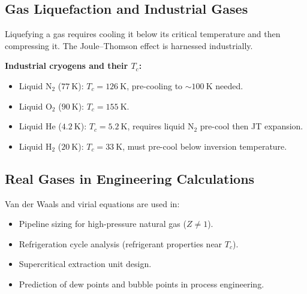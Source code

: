 \documentclass[12pt,a4paper]{article}
\begin{document}
\subsection{Gas Liquefaction and Industrial Gases}
Liquefying a gas requires cooling it below its critical temperature and then compressing it. The Joule--Thomson effect is harnessed industrially.

\begin{tcolorbox}[tikzbox, title={Linde Liquefaction Cycle (Schematic)}]
\centering
{}
\end{tcolorbox}

\textbf{Industrial cryogens and their $T_c$:}
\begin{itemize}[leftmargin=*, itemsep=1pt, topsep=2pt]
  \item Liquid $\mathrm{N_2}$ ($77\ \mathrm{K}$): $T_c=126\ \mathrm{K}$, pre-cooling to $\sim100\ \mathrm{K}$ needed.
  \item Liquid $\mathrm{O_2}$ ($90\ \mathrm{K}$): $T_c=155\ \mathrm{K}$.
  \item Liquid $\mathrm{He}$ ($4.2\ \mathrm{K}$): $T_c=5.2\ \mathrm{K}$, requires liquid $\mathrm{N_2}$ pre-cool then JT expansion.
  \item Liquid $\mathrm{H_2}$ ($20\ \mathrm{K}$): $T_c=33\ \mathrm{K}$, must pre-cool below inversion temperature.
\end{itemize}

\subsection{Real Gases in Engineering Calculations}
Van der Waals and virial equations are used in:
\begin{itemize}[leftmargin=*, itemsep=1pt, topsep=2pt]
  \item Pipeline sizing for high-pressure natural gas ($Z\neq1$).
  \item Refrigeration cycle analysis (refrigerant properties near $T_c$).
  \item Supercritical extraction unit design.
  \item Prediction of dew points and bubble points in process engineering.
\end{itemize}
\end{document}
